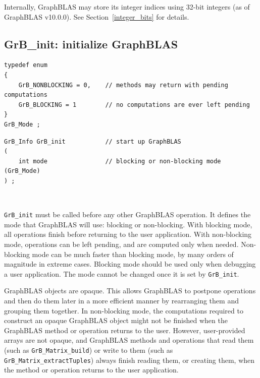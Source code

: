 Internally, GraphBLAS may store its integer indices using 32-bit integers
(as of GraphBLAS v10.0.0).  See Section~\ref{integer_bits} for details.

\subsection{{\sf GrB\_init:} initialize GraphBLAS} %
\label{init}

\begin{mdframed}[userdefinedwidth=6in]
{\footnotesize
\begin{verbatim}
typedef enum
{
    GrB_NONBLOCKING = 0,    // methods may return with pending computations
    GrB_BLOCKING = 1        // no computations are ever left pending
}
GrB_Mode ;
\end{verbatim}
}\end{mdframed}

\begin{mdframed}[userdefinedwidth=6in]
{\footnotesize
\begin{verbatim}
GrB_Info GrB_init           // start up GraphBLAS
(
    int mode                // blocking or non-blocking mode (GrB_Mode)
) ;
\end{verbatim}
}\end{mdframed}

\hypertarget{link:init}{\mbox{ }}%
\verb'GrB_init' must be called before any other GraphBLAS operation.  It
defines the mode that GraphBLAS will use:  blocking or non-blocking.  With
blocking mode, all operations finish before returning to the user application.
With non-blocking mode, operations can be left pending, and are computed only
when needed.  Non-blocking mode can be much faster than blocking mode, by many
orders of magnitude in extreme cases.  Blocking mode should be used only when
debugging a user application.  The mode cannot be changed once it is set by
\verb'GrB_init'.

GraphBLAS objects are opaque.  This allows GraphBLAS to
postpone operations and then do them later in a more efficient manner by
rearranging them and grouping them together.  In non-blocking mode, the
computations required to construct an opaque GraphBLAS object might not be
finished when the GraphBLAS method or operation returns to the user.  However,
user-provided arrays are not opaque, and GraphBLAS methods and operations that
read them (such as \verb'GrB_Matrix_build') or write to them (such as
\verb'GrB_Matrix_extractTuples') always finish reading them, or creating them,
when the method or operation returns to the user application.

